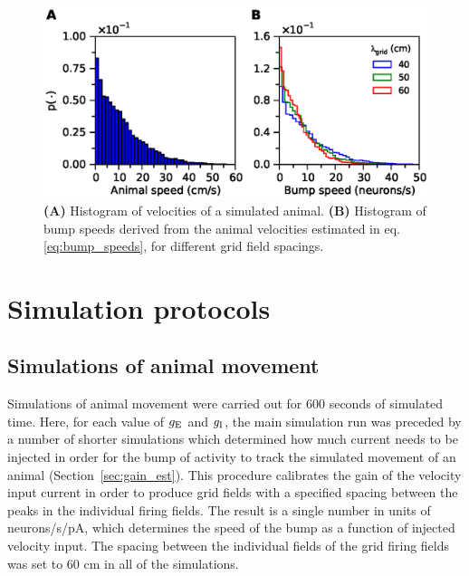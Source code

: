 \documentclass[a4paper,12pt]{article}
\newcommand{\ssc}[3]{\ensuremath{#1_{\text{#2}_{\text{#3}}}}}
\newcommand{\gE      }{\ssc{g}      {\scriptsize{E}}{}}
\newcommand{\gI      }{\ssc{g}      {\scriptsize{I}}{}}
\begin{document}
\renewcommand{\figurename}{Supplementary Methods Figure}
\begin{figure}[th]
    \begin{center}
        \includegraphics[trim=0 0.6cm 0 0 ]{fig/velocity_histograms}
    \end{center}
    \internallinenumbers
    \caption{\textbf{(A)} Histogram of velocities of a simulated animal.
    \textbf{(B)} Histogram of bump speeds derived from the animal velocities
    estimated in eq. \eqref{eq:bump_speeds}, for different grid field spacings.}
    \label{fig:velocity_histograms}
\end{figure}


\section{Simulation protocols} \label{sec:noise_protocols}

\subsection{Simulations of animal movement} \label{sec:noise_grids_protocol}

Simulations of animal movement were carried out for 600 seconds of simulated
time.  Here, for each value of $\gE$ and $\gI$, the main simulation run was
preceded by a number of shorter simulations which determined how much current
needs to be injected in order for the bump of activity to track the simulated
movement of an animal (Section~\ref{sec:gain_est}). This procedure calibrates
the gain of the velocity input current in order to produce grid fields with a
specified spacing between the peaks in the individual firing fields. The result
is a single number in units of neurons/s/pA, which determines the speed of the
bump as a function of injected velocity input. The spacing between the
individual fields of the grid firing fields was set to 60 cm in all of the
simulations.
\end{document}
